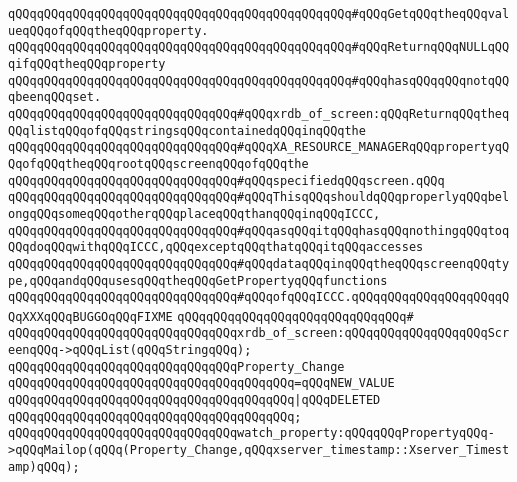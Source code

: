 \verb|qQQqqQQqqQQqqQQqqQQqqQQqqQQqqQQqqQQqqQQqqQQqqQQq#qQQqGetqQQqtheqQQqvalueqQQqofqQQqtheqQQqproperty.|\newline
\verb|qQQqqQQqqQQqqQQqqQQqqQQqqQQqqQQqqQQqqQQqqQQqqQQq#qQQqReturnqQQqNULLqQQqifqQQqtheqQQqproperty|\newline
\verb|qQQqqQQqqQQqqQQqqQQqqQQqqQQqqQQqqQQqqQQqqQQqqQQq#qQQqhasqQQqqQQqnotqQQqbeenqQQqset.|\newline
\newline
\newline
\verb|qQQqqQQqqQQqqQQqqQQqqQQqqQQqqQQq#qQQqxrdb_of_screen:qQQqReturnqQQqtheqQQqlistqQQqofqQQqstringsqQQqcontainedqQQqinqQQqthe|\newline
\verb|qQQqqQQqqQQqqQQqqQQqqQQqqQQqqQQq#qQQqXA_RESOURCE_MANAGERqQQqpropertyqQQqofqQQqtheqQQqrootqQQqscreenqQQqofqQQqthe|\newline
\verb|qQQqqQQqqQQqqQQqqQQqqQQqqQQqqQQq#qQQqspecifiedqQQqscreen.qQQq|\newline
\verb|qQQqqQQqqQQqqQQqqQQqqQQqqQQqqQQq#qQQqThisqQQqshouldqQQqproperlyqQQqbelongqQQqsomeqQQqotherqQQqplaceqQQqthanqQQqinqQQqICCC,|\newline
\verb|qQQqqQQqqQQqqQQqqQQqqQQqqQQqqQQq#qQQqasqQQqitqQQqhasqQQqnothingqQQqtoqQQqdoqQQqwithqQQqICCC,qQQqexceptqQQqthatqQQqitqQQqaccesses|\newline
\verb|qQQqqQQqqQQqqQQqqQQqqQQqqQQqqQQq#qQQqdataqQQqinqQQqtheqQQqscreenqQQqtype,qQQqandqQQqusesqQQqtheqQQqGetPropertyqQQqfunctions|\newline
\verb|qQQqqQQqqQQqqQQqqQQqqQQqqQQqqQQq#qQQqofqQQqICCC.qQQqqQQqqQQqqQQqqQQqqQQqXXXqQQqBUGGOqQQqFIXME|\newline
\verb|qQQqqQQqqQQqqQQqqQQqqQQqqQQqqQQq#|\newline
\verb|qQQqqQQqqQQqqQQqqQQqqQQqqQQqqQQqxrdb_of_screen:qQQqqQQqqQQqqQQqqQQqScreenqQQq->qQQqList(qQQqStringqQQq);|\newline
\newline
\verb|qQQqqQQqqQQqqQQqqQQqqQQqqQQqqQQqProperty_Change|\newline
\verb|qQQqqQQqqQQqqQQqqQQqqQQqqQQqqQQqqQQqqQQq=qQQqNEW_VALUE|\newline
\verb|qQQqqQQqqQQqqQQqqQQqqQQqqQQqqQQqqQQqqQQq|\verb#|qQQqDELETED#\newline
\verb|qQQqqQQqqQQqqQQqqQQqqQQqqQQqqQQqqQQqqQQq;|\newline
\newline
\verb|qQQqqQQqqQQqqQQqqQQqqQQqqQQqqQQqwatch_property:qQQqqQQqPropertyqQQq->qQQqMailop(qQQq(Property_Change,qQQqxserver_timestamp::Xserver_Timestamp)qQQq);|\newline
